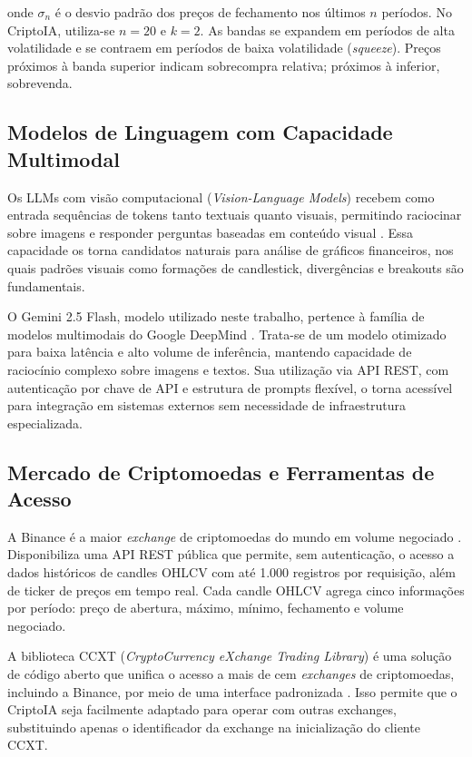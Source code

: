 \documentclass[conference]{IEEEtran}
\begin{document}
\noindent onde $\sigma_n$ é o desvio padrão dos preços de fechamento nos últimos $n$ períodos. No CriptoIA, utiliza-se $n=20$ e $k=2$. As bandas se expandem em períodos de alta volatilidade e se contraem em períodos de baixa volatilidade (\textit{squeeze}). Preços próximos à banda superior indicam sobrecompra relativa; próximos à inferior, sobrevenda.

\subsection{Modelos de Linguagem com Capacidade Multimodal}

Os LLMs com visão computacional (\textit{Vision-Language Models}) recebem como entrada sequências de tokens tanto textuais quanto visuais, permitindo raciocinar sobre imagens e responder perguntas baseadas em conteúdo visual \cite{liu2023visual}. Essa capacidade os torna candidatos naturais para análise de gráficos financeiros, nos quais padrões visuais como formações de candlestick, divergências e breakouts são fundamentais.

O Gemini 2.5 Flash, modelo utilizado neste trabalho, pertence à família de modelos multimodais do Google DeepMind \cite{google2024gemini}. Trata-se de um modelo otimizado para baixa latência e alto volume de inferência, mantendo capacidade de raciocínio complexo sobre imagens e textos. Sua utilização via API REST, com autenticação por chave de API e estrutura de prompts flexível, o torna acessível para integração em sistemas externos sem necessidade de infraestrutura especializada.

\subsection{Mercado de Criptomoedas e Ferramentas de Acesso}

A Binance é a maior \textit{exchange} de criptomoedas do mundo em volume negociado \cite{binance2024}. Disponibiliza uma API REST pública que permite, sem autenticação, o acesso a dados históricos de candles OHLCV com até 1.000 registros por requisição, além de ticker de preços em tempo real. Cada candle OHLCV agrega cinco informações por período: preço de abertura, máximo, mínimo, fechamento e volume negociado.

A biblioteca CCXT (\textit{CryptoCurrency eXchange Trading Library}) é uma solução de código aberto que unifica o acesso a mais de cem \textit{exchanges} de criptomoedas, incluindo a Binance, por meio de uma interface padronizada \cite{ccxt2024}. Isso permite que o CriptoIA seja facilmente adaptado para operar com outras exchanges, substituindo apenas o identificador da exchange na inicialização do cliente CCXT.
\end{document}
